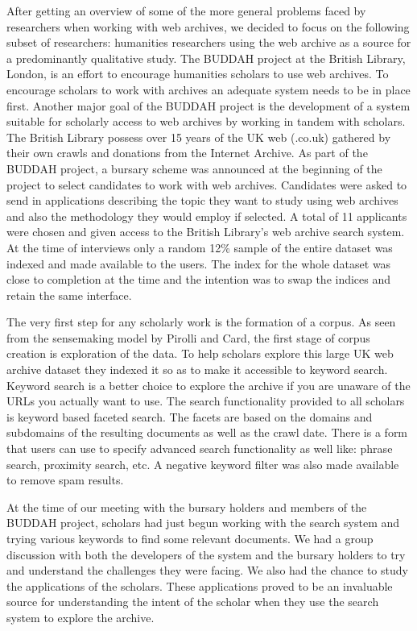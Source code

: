 After getting an overview of some of the more general problems faced by researchers when working with web archives, we decided to focus on the following subset of researchers: humanities researchers using the web archive as a source for a predominantly qualitative study. The BUDDAH project at the British Library, London, is an effort to encourage humanities scholars to use web archives. To encourage scholars to work with archives an adequate system needs to be in place first. Another major goal of the BUDDAH project is the development of a system suitable for scholarly access to web archives by working in tandem with scholars. The British Library possess over 15 years of the UK web (.co.uk) gathered by their own crawls and donations from the Internet Archive. As part of the BUDDAH project, a bursary scheme was announced at the beginning of the project to select candidates to work with web archives. Candidates were asked to send in applications describing the topic they want to study using web archives and also the methodology they would employ if selected. A total of 11 applicants were chosen and given access to the British Library's web archive search system. At the time of interviews only a random 12\% sample of the entire dataset was indexed and made available to the users. The index for the whole dataset was close to completion at the time and the intention was to swap the indices and retain the same interface.

The very first step for any scholarly work is the formation of a corpus. As seen from the sensemaking model by Pirolli and Card, the first stage of corpus creation is exploration of the data. To help scholars explore this large UK web archive dataset they indexed it so as to make it accessible to keyword search. Keyword search is a better choice to explore the archive if you are unaware of the URLs you actually want to use. The search functionality provided to all scholars is keyword based faceted search. The facets are based on the domains and subdomains of the resulting documents as well as the crawl date. There is a form that users can use to specify advanced search functionality as well like: phrase search, proximity search, etc. A negative keyword filter was also made available to remove spam results. 

At the time of our meeting with the bursary holders and members of the BUDDAH project, scholars had just begun working with the search system and trying various keywords to find some relevant documents. We had a group discussion with both the developers of the system and the bursary holders to try and understand the challenges they were facing. We also had the chance to study the applications of the scholars. These applications proved to be an invaluable source for understanding the intent of the scholar when they use the search system to explore the archive.

